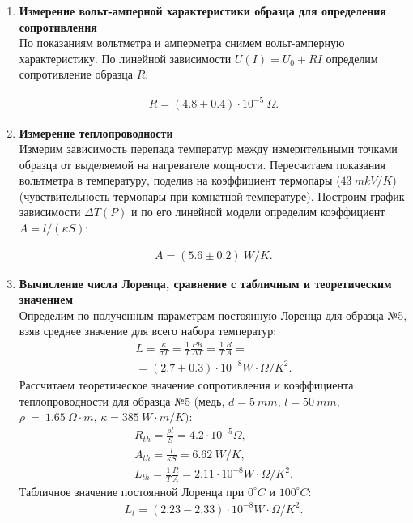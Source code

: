 \begin{enumerate}

\item 
\textbf{Измерение вольт-амперной характеристики образца для определения сопротивления}\\
По показаниям вольтметра и амперметра снимем вольт-амперную характеристику.
По линейной зависимости $U(I) = U_0 + RI$ определим сопротивление образца $R$:
\begin{figure}[h]
\end{figure}
\begin{gather*}
R = (4.8 \pm 0.4) \cdot 10^{-5}~\Omega.
\end{gather*}
\item
\textbf{Измерение теплопроводности}\\
Измерим зависимость перепада температур между измерительными точками образца от
выделяемой на нагревателе мощности. Пересчитаем показания вольтметра в температуру,
поделив на коэффициент термопары ($43~mkV/K$) (чувствительность термопары при комнатной температуре). Построим график зависимости $\Delta T(P)$ и по его линейной
модели определим коэффициент $A = l/(\kappa S)$:
\begin{figure}[h]
\end{figure}
\begin{gather*}
A = (5.6 \pm 0.2)~W/K.
\end{gather*}
\item
\textbf{Вычисление числа Лоренца, сравнение с табличным и теоретическим значением}\\
Определим по полученным параметрам постоянную Лоренца для образца №5, взяв среднее
значение для всего набора температур:
\begin{gather*}
L = \frac{\kappa}{\sigma T} = \frac{1}{T}\frac{PR}{\Delta T} =  \frac{1}{T}\frac{R}{A} = \\
= (2.7 \pm 0.3)\cdot 10^{-8} W\cdot\Omega / K^{2}.
\end{gather*}
Рассчитаем теоретическое значение сопротивления и коэффициента теплопроводности для образца №5 (медь, $d = 5~mm$, $l = 50~mm$, $\rho~=~1.65~\Omega \cdot m$, $\kappa = 385~W\cdot m/K)$:
\begin{gather*}
R_{th} = \frac{\rho l}{S} = 4.2 \cdot 10^{-5} \Omega,\\
A_{th} = \frac{l}{\kappa S} = 6.62~W/K,\\
L_{th} = \frac{1}{T}\frac{R}{A} = 2.11\cdot10^{-8}W\cdot\Omega/K^2.
\end{gather*}
Табличное значение постоянной Лоренца при $0^{\circ}C$ и $100^{\circ}C$:
\begin{gather*}
L_{t} = (2.23 - 2.33)\cdot 10^{-8} W\cdot\Omega/K^2.
\end{gather*}
\end{enumerate}
